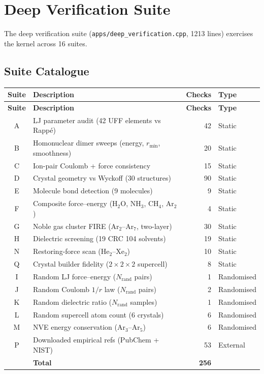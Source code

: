 \documentclass[11pt,twoside]{article}
\newcommand{\rmin}{r_{\mathrm{min}}}
\begin{document}
\section{Deep Verification Suite}
\label{sec:deep}

The deep verification suite (\texttt{apps/deep\_verification.cpp}, 1213
lines) exercises the kernel across 16 suites.

\subsection{Suite Catalogue}

\begin{longtable}{clrl}
\toprule
\textbf{Suite} & \textbf{Description} & \textbf{Checks} & \textbf{Type} \\
\midrule
\endfirsthead
\toprule
\textbf{Suite} & \textbf{Description} & \textbf{Checks} & \textbf{Type} \\
\midrule
\endhead
A & LJ parameter audit (42 UFF elements vs Rapp\'{e}) & 42 & Static \\
B & Homonuclear dimer sweeps (energy, $\rmin$, smoothness) & 20 & Static \\
C & Ion-pair Coulomb + force consistency & 15 & Static \\
D & Crystal geometry vs Wyckoff (30 structures) & 90 & Static \\
E & Molecule bond detection (9 molecules) & 9 & Static \\
F & Composite force--energy (H$_2$O, NH$_3$, CH$_4$, Ar$_2$) & 4 & Static \\
G & Noble gas cluster FIRE (Ar$_2$--Ar$_7$, two-layer) & 30 & Static \\
H & Dielectric screening (19 CRC 104 solvents) & 19 & Static \\
N & Restoring-force scan (He$_2$--Xe$_2$) & 10 & Static \\
Q & Crystal builder fidelity ($2\times2\times2$ supercell) & 8 & Static \\
\midrule
I & Random LJ force--energy ($N_{\mathrm{rand}}$ pairs) & 1 & Randomised \\
J & Random Coulomb $1/r$ law ($N_{\mathrm{rand}}$ pairs) & 2 & Randomised \\
K & Random dielectric ratio ($N_{\mathrm{rand}}$ samples) & 1 & Randomised \\
L & Random supercell atom count (6 crystals) & 6 & Randomised \\
M & NVE energy conservation (Ar$_3$--Ar$_5$) & 6 & Randomised \\
\midrule
P & Downloaded empirical refs (PubChem + NIST) & 53 & External \\
\midrule
  & \textbf{Total} & \textbf{256} & \\
\bottomrule
\end{longtable}
\end{document}

